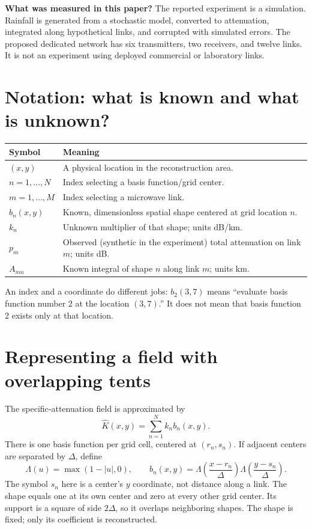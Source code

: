 \documentclass[11pt,a4paper]{article}
\begin{document}
\textbf{What was measured in this paper?} The reported experiment is a simulation. Rainfall is generated from a stochastic model, converted to attenuation, integrated along hypothetical links, and corrupted with simulated errors. The proposed dedicated network has six transmitters, two receivers, and twelve links. It is not an experiment using deployed commercial or laboratory links.
\section{Notation: what is known and what is unknown?}
\begin{center}
\begin{tabular}{p{24mm}p{104mm}}
\toprule
Symbol & Meaning \\
\midrule
$(x,y)$ & A physical location in the reconstruction area.\\
$n=1,\ldots,N$ & Index selecting a basis function/grid center.\\
$m=1,\ldots,M$ & Index selecting a microwave link.\\
$b_n(x,y)$ & Known, dimensionless spatial shape centered at grid location $n$.\\
$k_n$ & Unknown multiplier of that shape; units dB/km.\\
$p_m$ & Observed (synthetic in the experiment) total attenuation on link $m$; units dB.\\
$A_{mn}$ & Known integral of shape $n$ along link $m$; units km.\\
\bottomrule
\end{tabular}
\end{center}
An index and a coordinate do different jobs: $b_2(3,7)$ means ``evaluate basis function number 2 at the location $(3,7)$.'' It does not mean that basis function 2 exists only at that location.
\section{Representing a field with overlapping tents}
The specific-attenuation field is approximated by
\begin{equation}
\widehat K(x,y)=\sum_{n=1}^N k_n b_n(x,y).
\end{equation}
There is one basis function per grid cell, centered at $(r_n,s_n)$. If adjacent centers are separated by $\Delta$, define
\[
\Lambda(u)=\max(1-|u|,0),\qquad
b_n(x,y)=\Lambda\!\left(\frac{x-r_n}{\Delta}\right)
\Lambda\!\left(\frac{y-s_n}{\Delta}\right).
\]
The symbol $s_n$ here is a center's $y$ coordinate, not distance along a link. The shape equals one at its own center and zero at every other grid center. Its support is a square of side $2\Delta$, so it overlaps neighboring shapes. The shape is fixed; only its coefficient is reconstructed.
\end{document}
